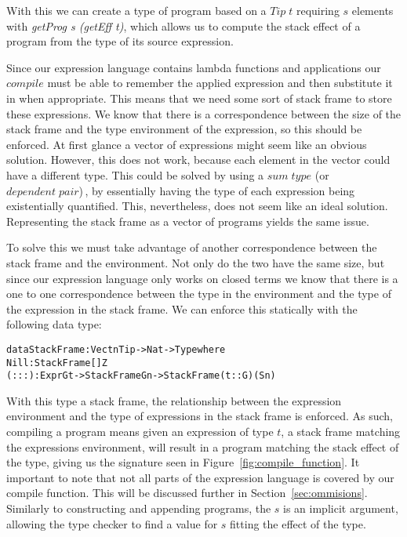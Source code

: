 With this we can create a type of program based on a $Tip\;t$ requiring $s$ elements with \textit{getProg s (getEff t)}, which allows us to compute the stack effect of a program from the type of its source expression.

Since our expression language contains lambda functions and applications our $compile$ must be able to remember the applied expression and then substitute it in when appropriate. This means that we need some sort of stack frame to store these expressions. We know that there is a correspondence between the size of the stack frame and the type environment of the expression, so this should be enforced. At first glance a vector of expressions might seem like an obvious solution. However, this does not work, because each element in the vector could have a different type. This could be solved by using a $sum\;type$ (or $dependent\;pair$)\,\cite[p. 14]{Brady:IdrisTutorial}, by essentially having the type of each expression being existentially quantified. This, nevertheless, does not seem like an ideal solution. Representing the stack frame as a vector of programs yields the same issue.

To solve this we must take advantage of another correspondence between the stack frame and the environment. Not only do the two have the same size, but since our expression language only works on closed terms we know that there is a one to one correspondence between the type in the environment and the type of the expression in the stack frame. We can enforce this statically with the following data type:

\begin{alltt}
data StackFrame : Vect n Tip -> Nat -> Type where
	Nill : StackFrame [] Z
	(:::) : Expr G t -> StackFrame G n -> StackFrame (t :: G) (S n)
\end{alltt}

With this type a stack frame, the relationship between the expression environment and the type of expressions in the stack frame is enforced. As such, compiling a program means given an expression of type $t$, a stack frame matching the expressions environment, will result in a program matching the stack effect of the type, giving us the signature seen in Figure~\ref{fig:compile_function}. It important to note that not all parts of the expression language is covered by our compile function. This will be discussed further in Section~\ref{sec:ommisions}. Similarly to constructing and appending programs, the $s$ is an implicit argument, allowing the type checker to find a value for $s$ fitting the effect of the type.

